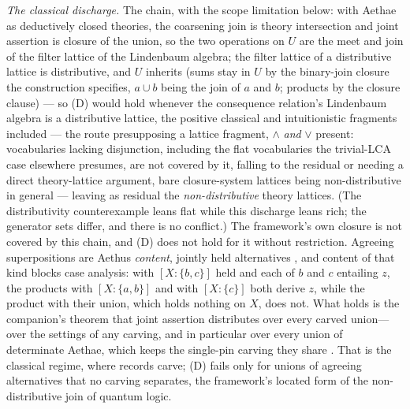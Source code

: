 \textit{The classical discharge.} The chain, with the scope limitation below: with Aethae as deductively closed theories, the coarsening join is theory intersection and joint assertion is closure of the union, so the two operations on $U$ are the meet and join of the filter lattice of the Lindenbaum algebra; the filter lattice of a distributive lattice is distributive, and $U$ inherits (sums stay in $U$ by the binary-join closure the construction specifies, $a \cup b$ being the join of $a$ and $b$; products by the closure clause) --- so (D) would hold whenever the consequence relation's Lindenbaum algebra is a distributive lattice, the positive classical and intuitionistic fragments included --- the route presupposing a lattice fragment, $\wedge$ \emph{and} $\vee$ present: vocabularies lacking disjunction, including the flat vocabularies the trivial-LCA case elsewhere presumes, are not covered by it, falling to the residual or needing a direct theory-lattice argument, bare closure-system lattices being non-distributive in general --- leaving as residual the \emph{non-distributive} theory lattices. (The distributivity counterexample leans flat while this discharge leans rich; the generator sets differ, and there is no conflict.) The framework's own closure is not covered by this chain, and (D) does not hold for it without restriction. Agreeing superpositions are Aethus \emph{content}, jointly held alternatives \cite{AethusUnion}, and content of that kind blocks case analysis: with $[X : \{b, c\}]$ held and each of $b$ and $c$ entailing $z$, the products with $[X : \{a, b\}]$ and with $[X : \{c\}]$ both derive $z$, while the product with their union, which holds nothing on $X$, does not. What holds is the companion's theorem that joint assertion distributes over every carved union---over the settings of any carving, and in particular over every union of determinate Aethae, which keeps the single-pin carving they share \cite{Aethus}. That is the classical regime, where records carve; (D) fails only for unions of agreeing alternatives that no carving separates, the framework's located form of the non-distributive join of quantum logic.

